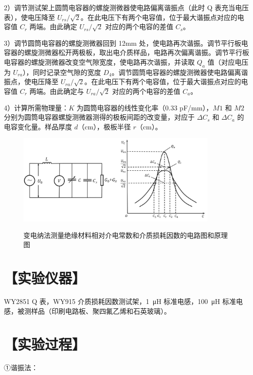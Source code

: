 \documentclass[a4paper,utf8]{article}
\begin{document}
\begin{enumerate}
            2）调节测试架上圆筒电容器的螺旋测微器使电路偏离谐振点（此时 Q 表充当电压表），使电压降至 $U_{rs}/\sqrt{2}$。在此电压下有两个电容值，位于最大谐振点对应的电容值 $C_r$ 两端。由此确定 $U_{rs}/\sqrt{2}$ 对应的两个电容的差值 $C_s$。

            3）调节圆筒电容器的螺旋测微器回到 12mm 处，使电路再次谐振。调节平行板电容器的螺旋测微器松开两极板，取出电介质样品，电路再次偏离谐振。调节平行板电容器的螺旋测微器改变空气隙宽度，使电路再次谐振，并读取 $Q_a$ 值（对应电压为 $U_{ra}$），同时记录空气隙的宽度 $D_4$。调节圆筒电容器的螺旋测微器使电路偏离谐振点，使电压降至 $U_{ra}/\sqrt{2}$。在此电压下有两个电容值，位于最大谐振点对应的电容值 $C_r$ 两端。由此确定与 $U_{ra}/\sqrt{2}$ 对应的两个电容的差值 $C_a$。

            4）计算所需物理量：$K$ 为圆筒电容器的线性变化率（0.33 pF/mm），$M1$ 和 $M2$ 分别为圆筒电容器螺旋测微器测得的极板间距的改变量，对应于 $\Delta C_s$ 和 $\Delta C_a$ 的电容变化量。样品厚度 $d$（cm），极板半径 $r$（cm）。

        \end{enumerate}


        \begin{figure}[!ht]\centering
            \includegraphics[width=100mm]{fg5.jpg}\
            \caption{变电纳法测量绝缘材料相对介电常数和介质损耗因数的电路图和原理图\label{fig:5}}
        \end{figure}

\newpage
\section*{【实验仪器】}%

    WY2851 Q 表，WY915 介质损耗因数测试架，\SI{1}{\micro\henry} 标准电感，\SI{100}{\micro\henry} 标准电感，被测样品（印刷电路板、聚四氟乙烯和石英玻璃）。

\section*{【实验过程】}%
①谐振法：
\end{document}

